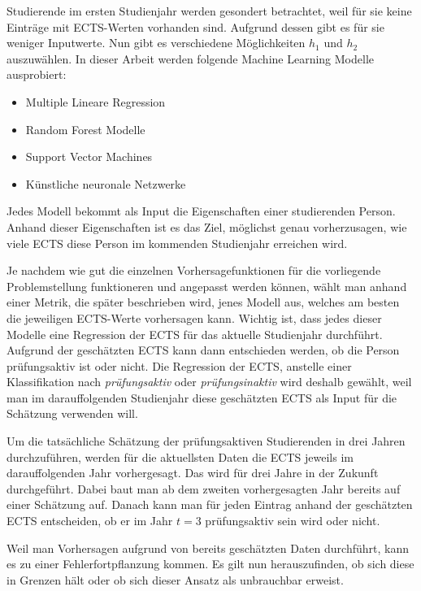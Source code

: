 Studierende im ersten Studienjahr werden gesondert betrachtet, weil f\"ur sie keine Eintr\"age mit ECTS-Werten vorhanden sind.
Aufgrund dessen gibt es f\"ur sie weniger Inputwerte.
Nun gibt es verschiedene M\"oglichkeiten $h_1$ und $h_2$ auszuwählen. In dieser Arbeit
werden folgende Machine Learning Modelle ausprobiert:

\begin{itemize}
  \item Multiple Lineare Regression
  \item Random Forest Modelle
  \item Support Vector Machines
  \item K\"unstliche neuronale Netzwerke
\end{itemize}

Jedes Modell bekommt als Input die Eigenschaften einer studierenden Person. Anhand dieser Eigenschaften ist es das Ziel, m\"oglichst genau
vorherzusagen, wie viele ECTS diese Person im kommenden Studienjahr erreichen wird.

Je nachdem wie gut die einzelnen Vorhersagefunktionen für die vorliegende Problemstellung funktioneren
und angepasst werden können, w\"ahlt man anhand einer Metrik, die sp\"ater beschrieben wird, jenes Modell aus, welches
am besten die jeweiligen ECTS-Werte vorhersagen kann.
Wichtig ist, dass jedes dieser Modelle eine Regression der ECTS f\"ur das aktuelle Studienjahr
durchf\"uhrt. Aufgrund der gesch\"atzten ECTS kann dann entschieden werden, ob die Person
pr\"ufungsaktiv ist oder nicht. Die Regression der ECTS, anstelle einer Klassifikation nach
\textit{pr\"ufungsaktiv} oder \textit{pr\"ufungsinaktiv} wird deshalb gew\"ahlt, weil man im darauffolgenden Studienjahr diese
gesch\"atzten ECTS als Input f\"ur die Sch\"atzung verwenden will.


Um die tats\"achliche Sch\"atzung der pr\"ufungsaktiven Studierenden in drei Jahren durchzuf\"uhren, werden f\"ur die
aktuellsten Daten die ECTS jeweils im darauffolgenden Jahr vorhergesagt. Das wird f\"ur drei Jahre in der Zukunft durchgef\"uhrt.
Dabei baut man ab dem zweiten vorhergesagten Jahr
bereits auf einer Sch\"atzung auf. Danach kann man f\"ur jeden Eintrag anhand der gesch\"atzten ECTS entscheiden, ob er im Jahr $t = 3$ pr\"ufungsaktiv sein wird oder nicht.

Weil man Vorhersagen aufgrund von bereits gesch\"atzten Daten durchf\"uhrt, kann es zu einer Fehlerfortpflanzung kommen.
Es gilt nun herauszufinden, ob sich diese in Grenzen h\"alt oder ob sich dieser Ansatz als unbrauchbar erweist.





